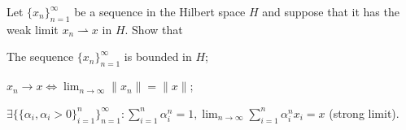 Let $\{x_n\}^{\infty}_{n=1}$ be a sequence in the Hilbert space $H$
and suppose that it has the weak limit $x_n \rightharpoonup x$ in
$H$. Show that
\begin{alist}
\item The sequence $\{x_n\}^{\infty}_{n=1}$ is bounded in $H$;
\item $x_n\rightarrow x \Leftrightarrow \lim_{n\rightarrow \infty}
\|x_n\|=\|x\|$;
\item $\exists \{\{\alpha_i, \alpha_i>0\}_{i=1}^n\}_{n=1}^{\infty} :
\sum_{i=1}^n\alpha_i^n=1, \lim_{n\rightarrow \infty}\sum_{i=1}^n
\alpha_i^nx_i=x$ (strong limit).
\end{alist}

